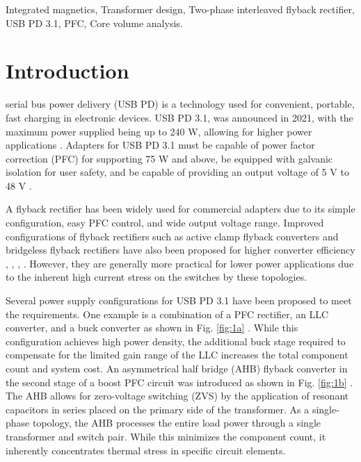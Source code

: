 \documentclass[lettersize,journal]{IEEEtran}
\begin{document}
\begin{IEEEkeywords}
Integrated magnetics, Transformer design, Two-phase interleaved flyback rectifier, USB PD 3.1, PFC, Core volume analysis.
\end{IEEEkeywords}

\section{Introduction}
 serial bus power delivery (USB PD) is a technology used for convenient, portable, fast charging in electronic devices. USB PD 3.1, was announced in 2021, with the maximum power supplied being up to 240 W, allowing for higher power applications \cite{ref1}. Adapters for USB PD 3.1 must be capable of power factor correction (PFC) for supporting 75 W and above, be equipped with galvanic isolation for user safety, and be capable of providing an output voltage of 5 V to 48 V \cite{ref2}.

A flyback rectifier has been widely used for commercial adapters due to its simple configuration, easy PFC control, and wide output voltage range. Improved configurations of flyback rectifiers such as active clamp flyback converters \cite{ref6, ref7} and bridgeless flyback rectifiers have also been proposed for higher converter efficiency \cite{ref8}, \cite{ref9}, \cite{ref10}, \cite{ref11}. However, they are generally more practical for lower power applications due to the inherent high current stress on the switches by these topologies. 

Several power supply configurations for USB PD 3.1 have been proposed to meet the requirements. One example is a combination of a PFC rectifier, an LLC converter, and a buck converter as shown in Fig. \ref{fig:1a} \cite{ref3, ref4}. While this configuration achieves high power density, the additional buck stage required to compensate for the limited gain range of the LLC increases the total component count and system cost. An asymmetrical half bridge (AHB) flyback converter in the second stage of a boost PFC circuit was introduced as shown in Fig. \ref{fig:1b} \cite{ref5}. The AHB allows for zero-voltage switching (ZVS) by the application of resonant capacitors in series placed on the primary side of the transformer. As a single-phase topology, the AHB processes the entire load power through a single transformer and switch pair. While this minimizes the component count, it inherently concentrates thermal stress in specific circuit elements.
\end{document}
